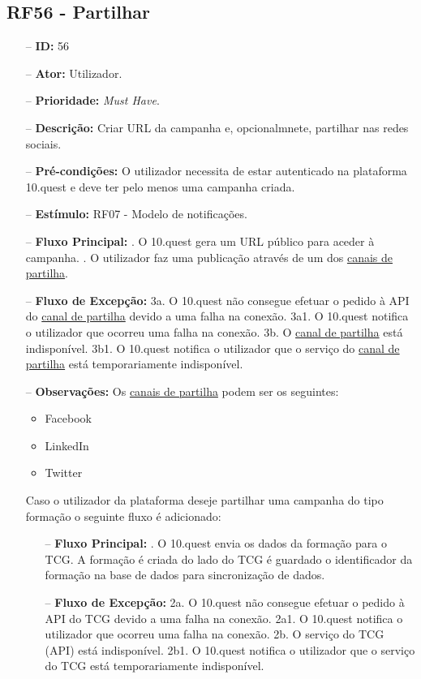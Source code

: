 \subsection{RF56 - Partilhar}
\begin{itemize}
	\item[--] \textbf{ID:} 56
	\item[--]  \textbf{Ator:} Utilizador.
	\item[--]  \textbf{Prioridade:} \textit{Must Have}.
	\item[--]  \textbf{Descrição:} Criar URL da campanha e, opcionalmnete, partilhar nas redes sociais.
	\item[--]  \textbf{Pré-condições:} O utilizador necessita de estar autenticado na plataforma 10.quest e deve ter pelo menos uma campanha criada.
	\item[--]  \textbf{Estímulo:} RF07 - Modelo de notificações.
	\item[--]  \textbf{Fluxo Principal:} 
	. O 10.quest gera um URL público para aceder à campanha.
	. O utilizador faz uma publicação através de um dos \underline{canais de partilha}.
	\item[--]  \textbf{Fluxo de Excepção:} 
	\subitem 3a. O 10.quest não consegue efetuar o pedido à API do \underline{canal de partilha} devido a uma falha na conexão.
	\subitem 3a1. O 10.quest notifica o utilizador que ocorreu uma falha na conexão.
	\subitem 3b. O \underline{canal de partilha} está indisponível.
	\subitem 3b1. O 10.quest notifica o utilizador que o serviço do \underline{canal de partilha} está temporariamente indisponível.
	\item[--]  \textbf{Observações:} Os \underline{canais de partilha} podem ser os seguintes:
	\begin{itemize}
		\item Facebook
		\item LinkedIn
		\item Twitter
	\end{itemize}
	Caso o utilizador da plataforma deseje partilhar uma campanha do tipo formação o seguinte fluxo é adicionado:
	\begin{itemize}
		\item[--]  \textbf{Fluxo Principal:}
			. O 10.quest envia os dados da formação para o TCG. A formação é criada do lado do TCG é guardado o identificador da formação na base de dados para sincronização de dados.
		\item[--]  \textbf{Fluxo de Excepção:}
			\subitem 2a. O 10.quest não consegue efetuar o pedido à API do TCG devido a uma falha na conexão.
			\subitem 2a1. O 10.quest notifica o utilizador que ocorreu uma falha na conexão.
			\subitem 2b. O serviço do TCG (API) está indisponível.
			\subitem 2b1. O 10.quest notifica o utilizador que o serviço do TCG está temporariamente indisponível. 
	\end{itemize}

	
\end{itemize}
\newpage

